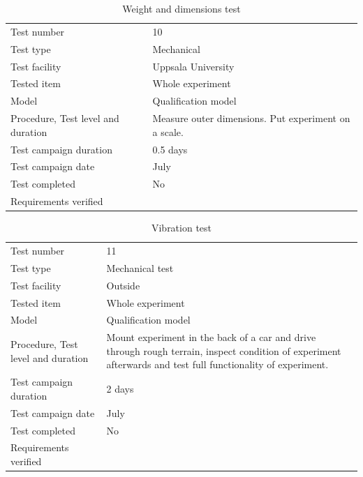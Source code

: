 \begin{table}[H]
\centering
\caption{Weight and dimensions test}
\label{tab:weight_test}
\begin{tabular}{L{5cm}L{10cm}}
\toprule
Test number & 10 \\
Test type & Mechanical \\
Test facility & Uppsala University \\
Tested item & Whole experiment \\
Model & Qualification model \\
Procedure, Test level and duration & Measure outer dimensions. Put experiment on a scale. \\
Test campaign duration & 0.5 days \\
Test campaign date & July \\
Test completed & No \\
Requirements verified & \\
\bottomrule
\end{tabular}
\end{table}


\begin{table}[H]
\centering
\caption{Vibration test}
\label{tab:test_vibration}
\begin{tabular}{L{5cm}L{10cm}}
\toprule
Test number & 11 \\
Test type & Mechanical test \\
Test facility & Outside \\
Tested item & Whole experiment \\
Model & Qualification model \\
Procedure, Test level and duration & Mount experiment in the back of a car and drive through rough terrain, inspect condition of experiment afterwards and test full functionality of experiment. \\
Test campaign duration & 2 days \\
Test campaign date & July \\
Test completed & No \\
Requirements verified & \\
\bottomrule
\end{tabular}
\end{table}


